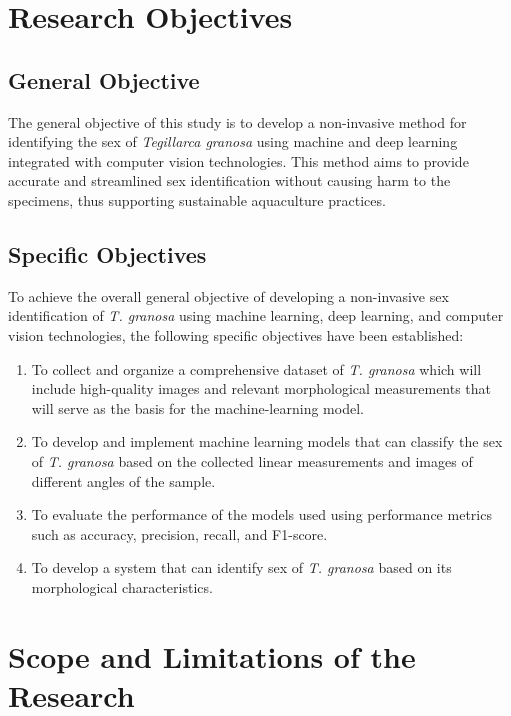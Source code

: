 \section{Research Objectives}
\label{sec:researchobjectives}

\subsection{General Objective}
\label{sec:generalobjective}

The general objective of this study is to develop a non-invasive method for identifying the sex of \textit{Tegillarca granosa} using machine and deep learning integrated with computer vision technologies. This method aims to provide accurate and streamlined sex identification without causing harm to the specimens, thus supporting sustainable aquaculture practices.

\subsection{Specific Objectives}
\label{sec:specificobjectives}

To achieve the overall general objective of developing a non-invasive sex identification of \textit{T. granosa} using machine learning, deep learning, and computer vision technologies, the following specific objectives have been established:  

\begin{enumerate}
   \item To collect and organize a comprehensive dataset of \textit{T. granosa} which will include high-quality images and relevant morphological measurements that will serve as the basis for the machine-learning model.
 
   \item To develop and implement machine learning models that can classify the sex of \textit{T. granosa} based on the collected linear measurements and images of different angles of the sample.
   
   \item To evaluate the performance of the models used using performance metrics such as accuracy, precision, recall, and F1-score. 
   
   \item To develop a system that can identify sex of \textit{T. granosa} based on its morphological characteristics. 
\end{enumerate}


\section{Scope and Limitations of the Research}
\label{sec:scopelimitations}

